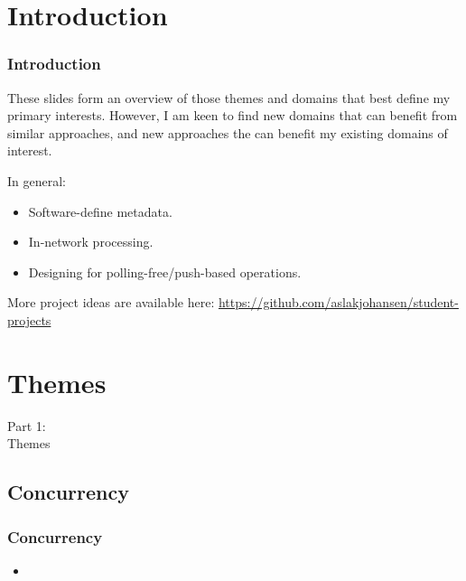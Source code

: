\section{Introduction}
\begin{frame}
    \frametitle{Introduction}
    \vspace{3mm}
    These slides form an overview of those themes and domains that best define my primary interests. However, I am keen to find new domains that can benefit from similar approaches, and new approaches the can benefit my existing domains of interest.
    
    \vspace{3mm}
    In general:
    \begin{itemize}
      \item Software-define metadata.
      \item In-network processing.
      \item Designing for polling-free/push-based operations.
    \end{itemize}
    
    \vspace{3mm}
    More project ideas are available here: \url{https://github.com/aslakjohansen/student-projects}
\end{frame}

\section{Themes}
\begin{frame}
    \vspace{25mm}
    \begin{center}
        \Huge{Part 1:\\Themes}
    \end{center}
\end{frame}

\subsection{Concurrency}
\begin{frame}
    \frametitle{Concurrency}
    \vspace{3mm}
    \begin{itemize}
        \item
    \end{itemize}
\end{frame}

